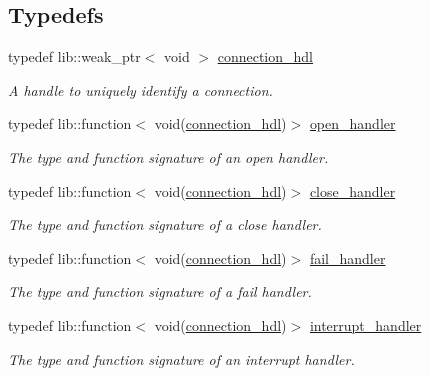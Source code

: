 \subsection*{Typedefs}
\begin{DoxyCompactItemize}
\item 
typedef lib\+::weak\+\_\+ptr$<$ void $>$ \hyperlink{namespacewebsocketpp_a6b3d26a10ee7229b84b776786332631d}{connection\+\_\+hdl}
\begin{DoxyCompactList}\small\item\em A handle to uniquely identify a connection. \end{DoxyCompactList}\item 
typedef lib\+::function$<$ void(\hyperlink{namespacewebsocketpp_a6b3d26a10ee7229b84b776786332631d}{connection\+\_\+hdl})$>$ \hyperlink{namespacewebsocketpp_a53c8b4ae59cf13b5f883b119bbd14d72}{open\+\_\+handler}
\begin{DoxyCompactList}\small\item\em The type and function signature of an open handler. \end{DoxyCompactList}\item 
typedef lib\+::function$<$ void(\hyperlink{namespacewebsocketpp_a6b3d26a10ee7229b84b776786332631d}{connection\+\_\+hdl})$>$ \hyperlink{namespacewebsocketpp_a27acb39e01cbca06ccc4e4e8eb8f877d}{close\+\_\+handler}
\begin{DoxyCompactList}\small\item\em The type and function signature of a close handler. \end{DoxyCompactList}\item 
typedef lib\+::function$<$ void(\hyperlink{namespacewebsocketpp_a6b3d26a10ee7229b84b776786332631d}{connection\+\_\+hdl})$>$ \hyperlink{namespacewebsocketpp_a5bb2e61cfe649b2e012f1a2c5693a4d5}{fail\+\_\+handler}
\begin{DoxyCompactList}\small\item\em The type and function signature of a fail handler. \end{DoxyCompactList}\item 
typedef lib\+::function$<$ void(\hyperlink{namespacewebsocketpp_a6b3d26a10ee7229b84b776786332631d}{connection\+\_\+hdl})$>$ \hyperlink{namespacewebsocketpp_a55f6947df7673a9de3c44b6bd5d4a82a}{interrupt\+\_\+handler}
\begin{DoxyCompactList}\small\item\em The type and function signature of an interrupt handler. \end{DoxyCompactList}\item 

\end{DoxyCompactItemize}
